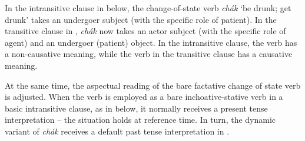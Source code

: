 In the intransitive clause in  below, the change-of-state verb \textit{chák} ‘be drunk; get drunk’ takes an undergoer subject (with the specific role of patient). In the transitive clause in , \textit{chák} now takes an actor subject (with the specific role of agent) and an undergoer (patient) object. In the intransitive clause, the verb has a non-causative meaning, while the verb in the transitive clause has a causative meaning. 


At the same time, the aspectual reading of the bare factative change of state verb is adjusted. When the verb is employed as a bare inchoative-stative verb in a basic intransitive clause, as in  below, it normally receives a present tense interpretation – the situation holds at reference time. In turn, the dynamic variant of \textit{chák} receives a default past tense interpretation in . 



